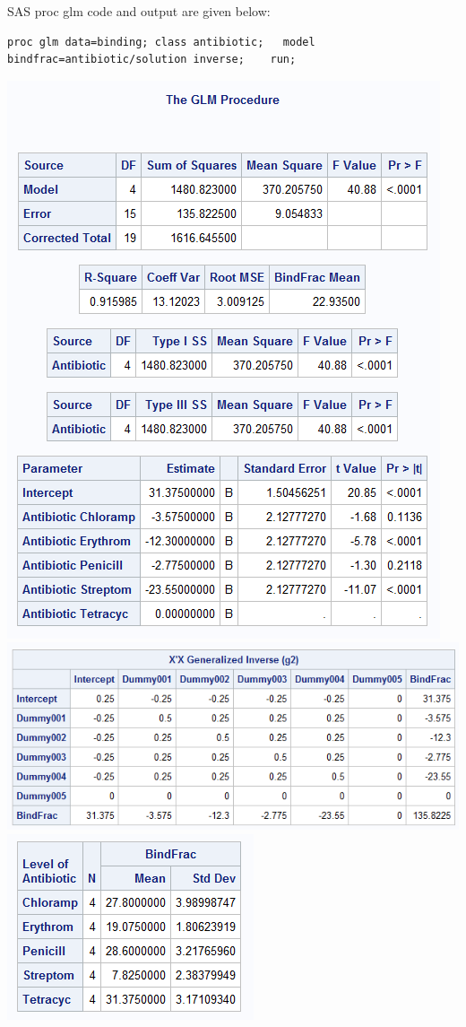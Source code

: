 \newpage

SAS proc glm code and output are given below:
\begin{small}
\begin{verbatim}
proc glm data=binding; class antibiotic;   model bindfrac=antibiotic/solution inverse;    run;
\end{verbatim}
\end{small}

\begin{flushleft}
\includegraphics[scale=0.7]{BindFracGLM}\\
\includegraphics[scale=0.7]{BindFracGLMInverse}\\
\includegraphics[scale=0.7]{BindFracMeans}
\end{flushleft}

